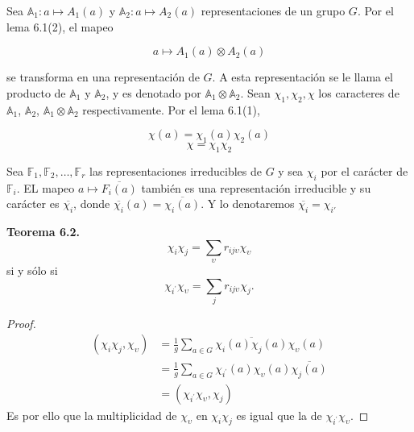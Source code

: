 \documentclass[12pt]{book}
\theoremstyle{definition}
\newcounter{in}
\begin{document}
Sea $\mathbb{A}_{1} \colon a \mapsto A_{1}(a)$ y
$\mathbb{A}_{2} \colon a \mapsto A_{2}(a)$ representaciones de un
grupo $G$. Por el lema 6.1(2), el mapeo

\begin{equation*}
  a \mapsto A_{1}(a) \otimes A_{2}(a)
\end{equation*}

se transforma en una representación de $G$. A esta representación se le llama el producto de $\mathbb{A}_{1}$ y $\mathbb{A}_{2}$, y es denotado por $\mathbb{A}_{1} \otimes \mathbb{A}_{2}$. Sean $\chi_{1}, \chi_2, \chi$ los caracteres de $\mathbb{A}_{1}$, $\mathbb{A}_{2}$, $\mathbb{A}_{1} \otimes \mathbb{A}_{2}$ respectivamente. Por el lema 6.1(1),

\begin{equation*}
  \chi(a)=\chi_{1}(a) \chi_{2}(a)
\end{equation*}
\begin{equation*}
  \chi = \chi_{1} \chi_{2}
\end{equation*}

Sea $\mathbb{F}_{1}, \mathbb{F}_{2}, \ldots, \mathbb{F}_{r}$ las
representaciones irreducibles de $G$ y sea $\chi_{i}$ por el carácter
de $\mathbb{F}_{i}$. EL mapeo $a \mapsto \overline{F_{i}(a)}$ también
es una representación irreducible y su carácter es
$\overline{\chi_{i}}$, donde
$\overline{\chi_{i}}(a) = \overline{\chi_{i}(a)}$. Y lo denotaremos
$\overline{\chi_{i}}=\chi_{i'}$

\textbf{Teorema 6.2. }
\begin{equation*}
  \chi_{i} \chi_{j} = \sum_{\upsilon} r_{ij \upsilon} \chi_{\upsilon}
\end{equation*}
si y sólo si
\begin{equation*}
  \chi_{i^{'}}\chi_{\upsilon} =  \sum_{j} r_{ij \upsilon} \chi_{j}.
\end{equation*}
\begin{proof}
  \begin{equation}
    \label{eq:5}
    \begin{aligned}
      (\chi_{i} \chi_{j}, \chi_{\upsilon}) &= \frac{1}{g} \sum_{a \in G} \overline{\chi_{i}(a) \chi_{j}(a)} \chi_{\upsilon}(a) \\
      & = \frac{1}{g} \sum_{a \in G} \chi_{i^{'}}(a) \chi_{\upsilon}(a) \overline{\chi_{j}(a)} \\
      & = (\chi_{i^{'}} \chi_{\upsilon},\chi_{j})
    \end{aligned}
  \end{equation}
  Es por ello que la multiplicidad de $\chi_{\upsilon}$ en
  $\chi_{i} \chi_{j}$ es igual que la de
  $\chi_{i^{'}} \chi_{\upsilon}$.  \backmatter
\end{proof}
\end{document}
